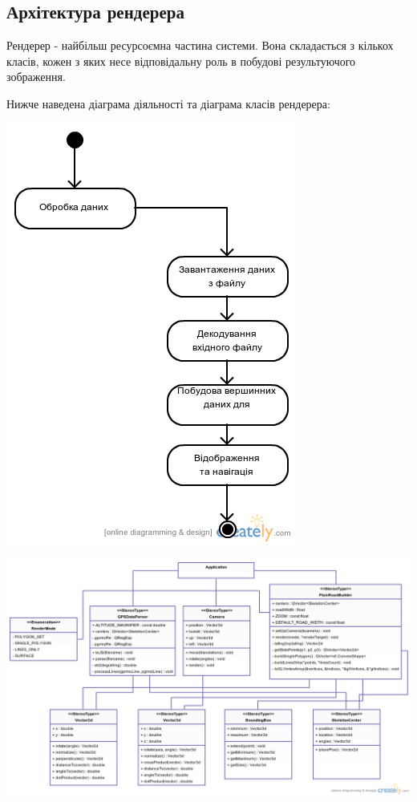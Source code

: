 \documentclass[simple,a4paper,14pt,ukrainian,utf8]{eskdtext}
\begin{document}
    \subsection{Архітектура рендерера}
    
    Рендерер - найбільш ресурсоємна частина системи. Вона складається з кількох класів, кожен з яких несе відповідальну роль в побудові результуючого зображення.
    
    Нижче наведена діаграма діяльності та діаграма класів рендерера:
    
    \vspace{3em}
	\includegraphics[scale=0.5]{images/renderer_workflow.png}
	
	\newpage
	\begin{landscape}
		\includegraphics[scale=0.5]{images/renderer_classes.png}
	\end{landscape}
\end{document}
